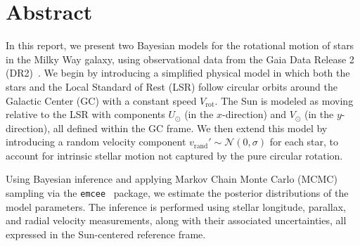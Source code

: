 \section*{Abstract}
In this report, we present two Bayesian models for the rotational motion of stars in the Milky Way galaxy, 
using observational data from the Gaia Data Release 2 (DR2)~\cite{GAIADR2}. 
We begin by introducing a simplified physical model in which both the stars and the Local Standard of Rest (LSR) 
follow circular orbits around the Galactic Center (GC) with a constant speed $V_{\text{rot}}$. 
The Sun is modeled as moving relative to the LSR with components $U_{\odot}$ (in the $x$-direction) 
and $V_{\odot}$ (in the $y$-direction), all defined within the GC frame. 
We then extend this model by introducing a random velocity component $v_{\text{rand}}' \sim \mathcal{N}(0, \sigma)$ for each star, to account for intrinsic stellar motion not captured by the pure circular rotation.


Using Bayesian inference and applying Markov Chain Monte Carlo (MCMC) sampling via the \texttt{emcee}~\cite{EMCEE} package, 
we estimate the posterior distributions of the model parameters. 
The inference is performed using stellar longitude, parallax, and radial velocity measurements, 
along with their associated uncertainties, all expressed in the Sun-centered reference frame.

